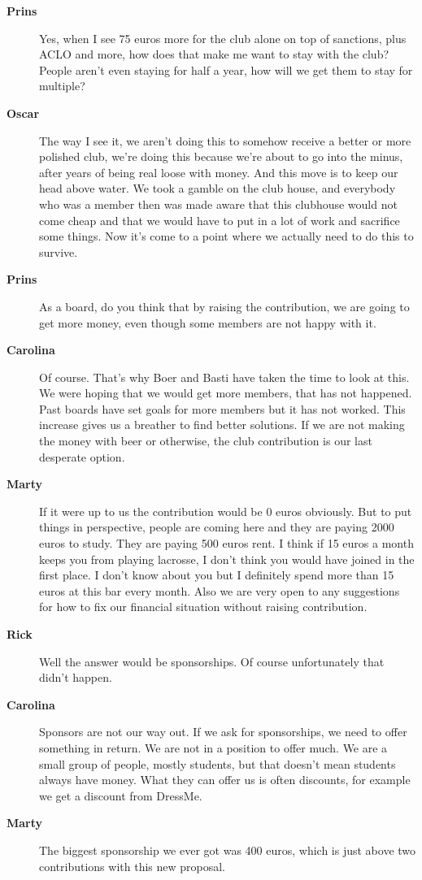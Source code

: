 \documentclass[12pt, a4paper]{article}
\newcommand{\speak}[2]{\begin{description}\item[\textbf{#1}]#2\end{description}}
\begin{document}
\speak{Prins}{Yes, when I see 75 euros more for the club alone on top of sanctions, plus ACLO and more, how does that make me want to stay with the club? People aren't even staying for half a year, how will we get them to stay for multiple?}

\speak{Oscar}{The way I see it, we aren't doing this to somehow receive a better or more polished club, we're doing this because we're about to go into the minus, after years of being real loose with money. And this move is to keep our head above water. We took a gamble on the club house, and everybody who was a member then was made aware that this clubhouse would not come cheap and that we would have to put in a lot of work and sacrifice some things. Now it's come to a point where we actually need to do this to survive.}

\speak{Prins}{As a board, do you think that by raising the contribution, we are going to get more money, even though some members are not happy with it.}

\speak{Carolina}{Of course. That's why Boer and Basti have taken the time to look at this. We were hoping that we would get more members, that has not happened. Past boards have set goals for more members but it has not worked. This increase gives us a breather to find better solutions. If we are not making the money with beer or otherwise, the club contribution is our last desperate option.}

\speak{Marty}{If it were up to us the contribution would be 0 euros obviously. But to put things in perspective, people are coming here and they are paying 2000 euros to study. They are paying 500 euros rent. I think if 15 euros a month keeps you from playing lacrosse, I don't think you would have joined in the first place. I don't know about you but I definitely spend more than 15 euros at this bar every month. Also we are very open to any suggestions for how to fix our financial situation without raising contribution.}

\speak{Rick}{Well the answer would be sponsorships. Of course unfortunately that didn't happen.}

\speak{Carolina}{Sponsors are not our way out. If we ask for sponsorships, we need to offer something in return. We are not in a position to offer much. We are a small group of people, mostly students, but that doesn't mean students always have money. What they can offer us is often discounts, for example we get a discount from DressMe.}

\speak{Marty}{The biggest sponsorship we ever got was 400 euros, which is just above two contributions with this new proposal.}
\end{document}
